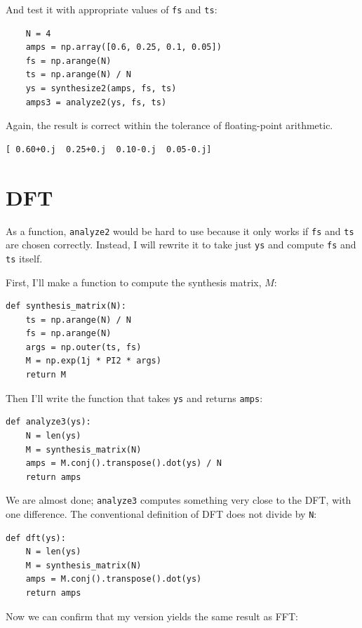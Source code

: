 \documentclass[12pt]{book}
\begin{document}
And test it with appropriate values of {\tt fs} and {\tt ts}:

\begin{verbatim}
    N = 4
    amps = np.array([0.6, 0.25, 0.1, 0.05])
    fs = np.arange(N)
    ts = np.arange(N) / N
    ys = synthesize2(amps, fs, ts)
    amps3 = analyze2(ys, fs, ts)
\end{verbatim}

Again, the result is correct within the tolerance of floating-point
arithmetic.

\begin{verbatim}
[ 0.60+0.j  0.25+0.j  0.10-0.j  0.05-0.j]
\end{verbatim}


\section{DFT}
\label{dftsection}

As a function, {\tt analyze2} would be hard to use because it
only works if {\tt fs} and {\tt ts} are chosen correctly.
Instead, I will rewrite it to take just {\tt ys} and compute {\tt fs}
and {\tt ts} itself.

First, I'll make a function to compute the synthesis matrix, $M$:

\begin{verbatim}
def synthesis_matrix(N):
    ts = np.arange(N) / N
    fs = np.arange(N)
    args = np.outer(ts, fs)
    M = np.exp(1j * PI2 * args)
    return M
\end{verbatim}

Then I'll write the function that takes {\tt ys} and returns
{\tt amps}:

\begin{verbatim}
def analyze3(ys):
    N = len(ys)
    M = synthesis_matrix(N)
    amps = M.conj().transpose().dot(ys) / N
    return amps
\end{verbatim}

We are almost done; {\tt analyze3} computes something very
close to the DFT, with one difference.  The conventional definition
of DFT does not divide by {\tt N}:

\begin{verbatim}
def dft(ys):
    N = len(ys)
    M = synthesis_matrix(N)
    amps = M.conj().transpose().dot(ys)
    return amps
\end{verbatim}

Now we can confirm that my version yields the same result as
FFT:
\end{document}

